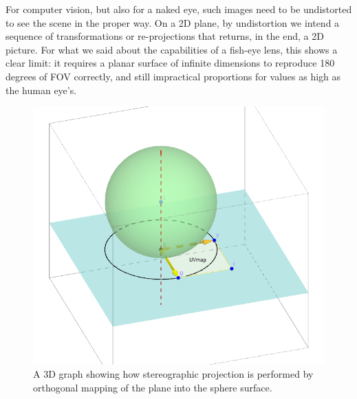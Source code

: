 For computer vision, but also for a naked eye, such images need to be undistorted to see the scene in the proper way. On a 2D plane, by undistortion we intend a sequence of transformations or re-projections that returns, in the end, a 2D picture. For what we said about the capabilities of a fish-eye lens, this shows a clear limit: it requires a planar surface of infinite dimensions to reproduce 180 degrees of FOV correctly, and still impractical proportions for values as high as the human eye's.

\begin{figure}
\centering
\includegraphics[width=0.7\linewidth]{schemas/fisheye_uv_map}
\caption{A 3D graph showing how stereographic projection is performed by orthogonal mapping of the plane into the sphere surface.}
\label{fig:fisheye_uv_mapped}
\end{figure}

